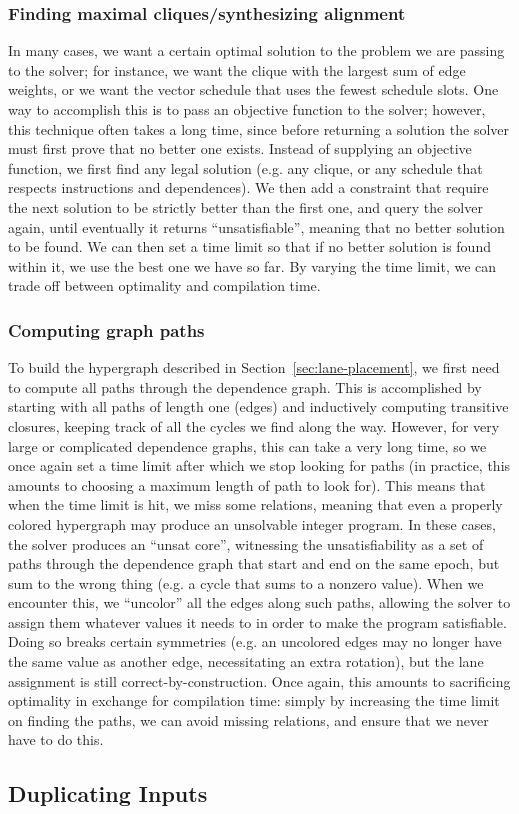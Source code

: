 \subsubsection*{Finding maximal cliques/synthesizing alignment}
In many cases, we want a certain optimal solution to the problem we are passing to the solver; for instance, we want the clique with the largest sum of edge weights, or we want the vector schedule that uses the fewest schedule slots.
One way to accomplish this is to pass an objective function to the solver; however, this technique often takes a long time, since before returning a solution the solver must first prove that no better one exists.
Instead of supplying an objective function, we first find any legal solution (e.g. any clique, or any schedule that respects instructions and dependences).
We then add a constraint that require the next solution to be strictly better than the first one, and query the solver again, until eventually it returns ``unsatisfiable'', meaning that no better solution to be found.
We can then set a time limit so that if no better solution is found within it, we use the best one we have so far.
By varying the time limit, we can trade off between optimality and compilation time.

\subsubsection*{Computing graph paths}
To build the hypergraph described in Section~\ref{sec:lane-placement}, we first need to compute all paths through the dependence graph.
This is accomplished by starting with all paths of length one (edges) and inductively computing transitive closures, keeping track of all the cycles we find along the way. 
However, for very large or complicated dependence graphs, this can take a very long time, so we once again set a time limit after which we stop looking for paths (in practice, this amounts to choosing a maximum length of path to look for).
This means that when the time limit is hit, we miss some relations, meaning that even a properly colored hypergraph may produce an unsolvable integer program.
In these cases, the solver produces an ``unsat core'', witnessing the unsatisfiability as a set of paths through the dependence graph that start and end on the same epoch, but sum to the wrong thing (e.g. a cycle that sums to a nonzero value).
When we encounter this, we ``uncolor'' all the edges along such paths, allowing the solver to assign them whatever values it needs to in order to make the program satisfiable.
Doing so breaks certain symmetries (e.g. an uncolored edges may no longer have the same value as another edge, necessitating an extra rotation), but the lane assignment is still correct-by-construction.
Once again, this amounts to sacrificing optimality in exchange for compilation time: simply by increasing the time limit on finding the paths, we can avoid missing relations, and ensure that we never have to do this.

\subsection{Duplicating Inputs}